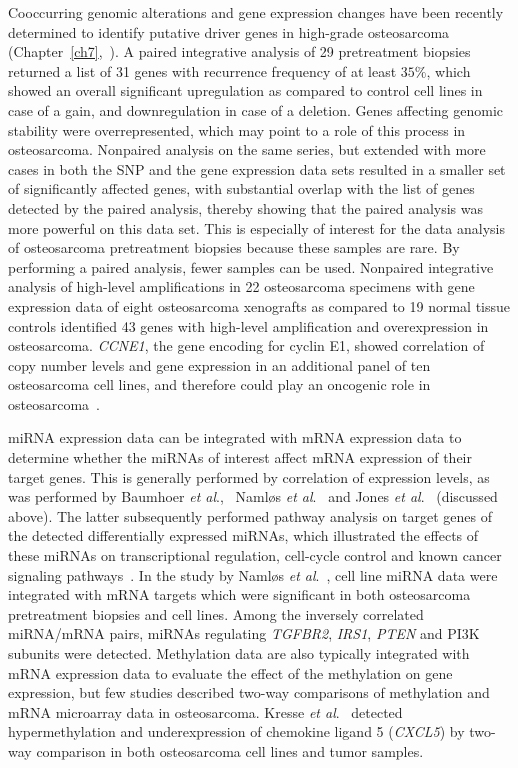 Cooccurring genomic alterations and gene expression
changes have been recently determined to identify putative
driver genes in high\hyp{}grade osteosarcoma (Chapter~\ref{ch7},~\cite{kuijjer2012identification}). A paired integrative
analysis of 29 pretreatment biopsies returned a list of 31
genes with recurrence frequency of at least $35\%$, which showed an
overall significant upregulation as compared to control cell
lines in case of a gain, and downregulation in case of a deletion.
Genes affecting genomic stability were overrepresented,
which may point to a role of this process in osteosarcoma.
Nonpaired analysis on the same series, but extended with
more cases in both the SNP and the gene expression data
sets resulted in a smaller set of significantly affected genes,
with substantial overlap with the list of genes detected by the
paired analysis, thereby showing that the paired analysis was
more powerful on this data set. This is especially of interest
for the data analysis of osteosarcoma pretreatment biopsies
because these samples are rare. By performing a paired analysis,
fewer samples can be used. Nonpaired integrative analysis
of high\hyp{}level amplifications in 22 osteosarcoma specimens
with gene expression data of eight osteosarcoma xenografts
as compared to 19 normal tissue controls identified 43 genes
with high\hyp{}level amplification and overexpression in osteosarcoma.
{\it CCNE1}, the gene encoding for cyclin E1, showed correlation
of copy number levels and gene expression in an
additional panel of ten osteosarcoma cell lines, and therefore
could play an oncogenic role in osteosarcoma~\cite{lockwood2011cyclin}.

miRNA expression data can be integrated with mRNA
expression data to determine whether the miRNAs of interest
affect mRNA expression of their target genes. This is
generally performed by correlation of expression levels, as
was performed by Baumhoer {\it et al}.,~\cite{baumhoer2012microrna} Naml{\o}s {\it et al}.~\cite{namlos2012modulation} and Jones {\it et al}.~\cite{jones2012mirna} (discussed above). The latter subsequently performed
pathway analysis on target genes of the detected differentially
expressed miRNAs, which illustrated the effects
of these miRNAs on transcriptional regulation, cell\hyp{}cycle
control and known cancer signaling pathways~\cite{jones2012mirna}. In the
study by Naml{\o}s {\it et al}.~\cite{namlos2012modulation}, cell line miRNA data were integrated
with mRNA targets which were significant in both
osteosarcoma pretreatment biopsies and cell lines. Among
the inversely correlated miRNA/mRNA pairs, miRNAs regulating
{\it TGFBR2}, {\it IRS1}, {\it PTEN} and PI3K subunits were
detected. Methylation data are also typically integrated with
mRNA expression data to evaluate the effect of the methylation
on gene expression, but few studies described two\hyp{}way
comparisons of methylation and mRNA microarray data in
osteosarcoma. Kresse {\it et al}.~\cite{kresse2012integrative} detected hypermethylation and
underexpression of chemokine ligand 5 ({\it CXCL5}) by two\hyp{}way
comparison in both osteosarcoma cell lines and tumor
samples.

